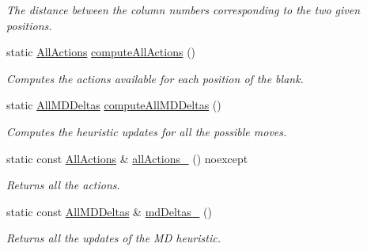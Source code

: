 \begin{DoxyCompactItemize}
\begin{DoxyCompactList}\small\item\em The distance between the column numbers corresponding to the two given positions. \end{DoxyCompactList}\item 
static \hyperlink{structslb_1_1ext_1_1domain_1_1sliding__tile_1_1SlidingTile_a8fff8f76f90786fdf02bbf86037aeea6}{All\+Actions} \hyperlink{structslb_1_1ext_1_1domain_1_1sliding__tile_1_1SlidingTile_ad52481727fb1624f5ada2f57807c4dc9}{compute\+All\+Actions} ()\hypertarget{structslb_1_1ext_1_1domain_1_1sliding__tile_1_1SlidingTile_ad52481727fb1624f5ada2f57807c4dc9}{}\label{structslb_1_1ext_1_1domain_1_1sliding__tile_1_1SlidingTile_ad52481727fb1624f5ada2f57807c4dc9}

\begin{DoxyCompactList}\small\item\em Computes the actions available for each position of the blank. \end{DoxyCompactList}\item 
static \hyperlink{structslb_1_1ext_1_1domain_1_1sliding__tile_1_1SlidingTile_a82f77d8b64d6c82de4df1ff94b617df8}{All\+M\+D\+Deltas} \hyperlink{structslb_1_1ext_1_1domain_1_1sliding__tile_1_1SlidingTile_abf0e81ff790b1812eeb04b1cef260ad6}{compute\+All\+M\+D\+Deltas} ()
\begin{DoxyCompactList}\small\item\em Computes the heuristic updates for all the possible moves. \end{DoxyCompactList}\item 
static const \hyperlink{structslb_1_1ext_1_1domain_1_1sliding__tile_1_1SlidingTile_a8fff8f76f90786fdf02bbf86037aeea6}{All\+Actions} \& \hyperlink{structslb_1_1ext_1_1domain_1_1sliding__tile_1_1SlidingTile_a5c16b98c10546e3538f13f69981bc20a}{all\+Actions\+\_\+} () noexcept
\begin{DoxyCompactList}\small\item\em Returns all the actions. \end{DoxyCompactList}\item 
static const \hyperlink{structslb_1_1ext_1_1domain_1_1sliding__tile_1_1SlidingTile_a82f77d8b64d6c82de4df1ff94b617df8}{All\+M\+D\+Deltas} \& \hyperlink{structslb_1_1ext_1_1domain_1_1sliding__tile_1_1SlidingTile_a28beffc0d55344e06a839d3cd9f309c3}{md\+Deltas\+\_\+} ()\hypertarget{structslb_1_1ext_1_1domain_1_1sliding__tile_1_1SlidingTile_a28beffc0d55344e06a839d3cd9f309c3}{}\label{structslb_1_1ext_1_1domain_1_1sliding__tile_1_1SlidingTile_a28beffc0d55344e06a839d3cd9f309c3}

\begin{DoxyCompactList}\small\item\em Returns all the updates of the MD heuristic. \end{DoxyCompactList}\end{DoxyCompactItemize}
